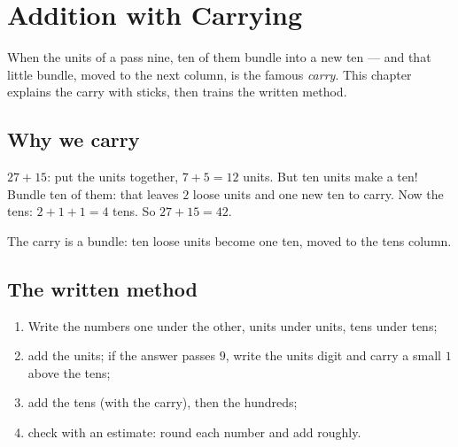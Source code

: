 \chapter{Addition with Carrying}\label{ch:g2:addition}

When the units of a  pass nine, ten of them bundle into a new
ten --- and that little bundle, moved to the next column, is the
famous \emph{carry}. This chapter explains the carry with sticks,
then trains the written method.

\section{Why we carry}

\begin{example}\label{ex:g2:addition:bundle}
$27 + 15$: put the units together, $7 + 5 = 12$ units. But ten
units make a ten! Bundle ten of them: that leaves $2$ loose units
and one new ten to carry. Now the tens: $2 + 1 + 1 = 4$ tens. So
$27 + 15 = 42$.
\end{example}

\begin{omfigure}

{\small The carry is a bundle: ten loose units become one ten, moved
to the tens column.}
\end{omfigure}

\section{The written method}

\begin{method}\label{met:g2:addition:column}
\begin{enumerate}
  \item Write the numbers one under the other, units under units,
        tens under tens;
  \item add the units; if the answer passes $9$, write the units
        digit and carry a small $1$ above the tens;
  \item add the tens (with the carry), then the hundreds;
  \item check with an estimate: round each number and add roughly.
\end{enumerate}
\end{method}

